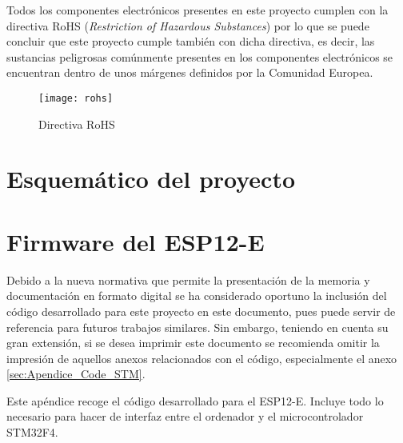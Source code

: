 Todos los componentes electrónicos presentes en este proyecto cumplen con la directiva RoHS (\textit{Restriction of Hazardous Substances}) por lo que se puede concluir que este proyecto cumple también con dicha directiva, es decir, las sustancias peligrosas comúnmente presentes en los componentes electrónicos se encuentran dentro de unos márgenes definidos por la Comunidad Europea.

\begin{figure} [h]
    \centering
    \texttt{[image: rohs]}
    \caption{Directiva RoHS \cite{rohs}}
    \label{fig:rohs}
\end{figure}

\chapter{Esquemático del proyecto\label{sec:Schematic}}

\chapter{Firmware del ESP12-E\label{sec:Apendice_Code_ESP}}

Debido a la nueva normativa que permite la presentación de la memoria y documentación en formato digital se ha considerado oportuno la inclusión del código desarrollado para este proyecto en este documento, pues puede servir de referencia para futuros trabajos similares. Sin embargo, teniendo en cuenta su gran extensión, si se desea imprimir este documento se recomienda omitir la impresión de aquellos anexos relacionados con el código, especialmente el anexo \ref{sec:Apendice_Code_STM}.

Este apéndice recoge el código desarrollado para el ESP12-E. Incluye todo lo necesario para hacer de interfaz entre el ordenador y el microcontrolador STM32F4.

